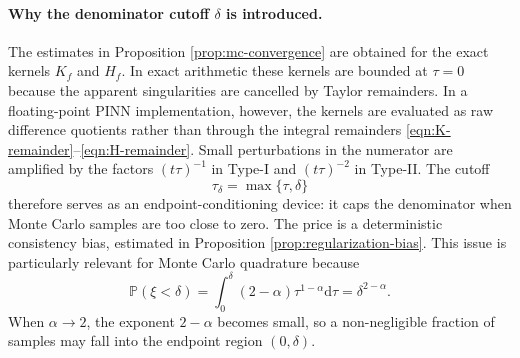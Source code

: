 \documentclass[preprint,3p,times]{elsarticle}
\def\d{\mathrm{d}}
\begin{document}
\paragraph*{Why the denominator cutoff $\delta$ is introduced.}
The estimates in Proposition \ref{prop:mc-convergence} are obtained for the exact kernels $K_f$ and $H_f$. In exact arithmetic these kernels are bounded at $\tau=0$ because the apparent singularities are cancelled by Taylor remainders. In a floating-point PINN implementation, however, the kernels are evaluated as raw difference quotients rather than through the integral remainders \eqref{eqn:K-remainder}--\eqref{eqn:H-remainder}. Small perturbations in the numerator are amplified by the factors $(t\tau)^{-1}$ in Type-I and $(t\tau)^{-2}$ in Type-II. The cutoff
\[
    \tau_\delta=\max\{\tau,\delta\}
\]
therefore serves as an endpoint-conditioning device: it caps the denominator when Monte Carlo samples are too close to zero. The price is a deterministic consistency bias, estimated in Proposition \ref{prop:regularization-bias}. This issue is particularly relevant for Monte Carlo quadrature because
\begin{equation}\label{eqn:beta-small-prob}
    \mathbb P(\xi<\delta)=\int_0^\delta(2-\alpha)\tau^{1-\alpha}\d\tau=\delta^{2-\alpha}.
\end{equation}
When $\alpha\to2$, the exponent $2-\alpha$ becomes small, so a non-negligible fraction of samples may fall into the endpoint region $(0,\delta)$.
\end{document}
